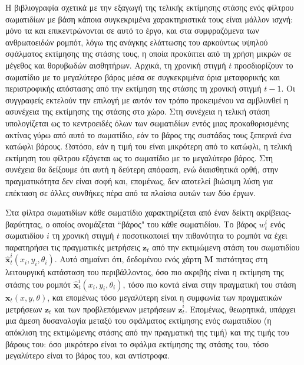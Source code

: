Η βιβλιογραφία σχετικά με την εξαγωγή της τελικής εκτίμησης στάσης ενός φίλτρου
σωματιδίων με βάση κάποια συγκεκριμένα χαρακτηριστικά τους είναι μάλλον ισχνή:
μόνο τα \cite{Liemhetcharat2010} και \cite{Coltin2013} επικεντρώνονται σε αυτό
το έργο, και στα συμφραζόμενα των ανθρωποειδών ρομπότ, λόγω της ανάγκης
ελάττωσης του αρκούντως υψηλού σφάλματος εκτίμησης της στάσης τους, η οποία
προκύπτει από τη χρήση μικρών σε μέγεθος και θορυβωδών αισθητήρων.  Αρχικά, τη
χρονική στιγμή $t$ προσδιορίζουν το σωματίδιο με το μεγαλύτερο βάρος μέσα σε
συγκεκριμένα όρια μεταφορικής και περιστροφικής απόστασης από την εκτίμηση της
στάσης τη χρονική στιγμή $t-1$. Οι συγγραφείς εκτελούν την επιλογή με αυτόν τον
τρόπο προκειμένου να αμβλυνθεί η ασυνέχεια της εκτίμησης της στάσης στο χώρο.
Στη συνέχεια η τελική στάση υπολογίζεται ως το κεντροειδές όλων των σωματιδίων
εντός μιας προκαθορισμένης ακτίνας γύρω από αυτό το σωματίδιο, εάν το βάρος της
συστάδας τους ξεπερνά ένα κατώφλι βάρους. Ωστόσο, εάν η τιμή του είναι
μικρότερη από το κατώφλι, η τελική εκτίμηση του φίλτρου εξάγεται ως το
σωματίδιο με το μεγαλύτερο βάρος. Στη συνέχεια θα δείξουμε ότι αυτή η δεύτερη
απόφαση, ενώ διαισθητικά ορθή, στην πραγματικότητα δεν είναι σοφή και,
επομένως, δεν αποτελεί βιώσιμη λύση για επέκταση σε άλλες συνθήκες πέρα από τα
πλαίσια αυτών των δύο έργων.

Στα φίλτρα σωματιδίων κάθε σωματίδιο χαρακτηρίζεται από έναν δείκτη
ακρίβειας-βαρύτητας, ο οποίος ονομάζεται ``βάρος" του κάθε σωματιδίου. Το βάρος
$w_t^i$ ενός σωματιδίου $i$ τη χρονική στιγμή $t$ ποσοτικοποιεί την πιθανότητα
το ρομπότ να έχει παρατηρήσει τις πραγματικές μετρήσεις $\bm{z}_t$ από την
εκτιμώμενη στάση του σωματιδίου $\hat{\bm{x}}_t^i(x_i, y_i, \theta_i)$.  Αυτό
σημαίνει ότι, δεδομένου ενός χάρτη $\bm{M}$ πιστότητας στη λειτουργική
κατάσταση του περιβάλλοντος, όσο πιο ακριβής είναι η εκτίμηση της στάσης του
ρομπότ $\hat{\bm{x}}_t^i(x_i, y_i, \theta_i)$, τόσο πιο κοντά είναι στην
πραγματική του στάση $\bm{x}_t(x,y,\theta)$, και επομένως τόσο μεγαλύτερη είναι
η συμφωνία των πραγματικών μετρήσεων $\bm{z}_t$ και των προβλεπόμενων μετρήσεων
$\hat{\bm{z}}_t^i$. Επομένως, θεωρητικά, υπάρχει μια άμεση δυσαναλογία μεταξύ
του σφάλματος εκτίμησης ενός σωματιδίου (η απόκλιση της εκτιμώμενης στάσης από
την πραγματική της τιμή) και της τιμής του βάρους του: όσο μικρότερο είναι το
σφάλμα εκτίμησης της στάσης του, τόσο μεγαλύτερο είναι το βάρος του, και
αντίστροφα.

